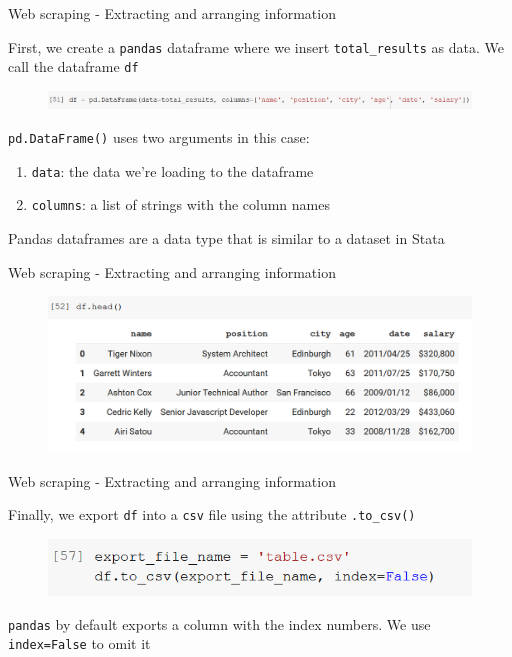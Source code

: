 \documentclass[aspectratio=169]{beamer}
\begin{document}
\begin{frame}{Web scraping - Extracting and arranging information}

	First, we create a \texttt{pandas} dataframe where we insert \texttt{total\_results} as data. We call the dataframe \texttt{df}

	\begin{figure}
		\centering
		\includegraphics[width=\linewidth]{img/df.png}
	\end{figure}

	\texttt{pd.DataFrame()} uses two arguments in this case:

	\begin{enumerate}
		\item \texttt{data}: the data we're loading to the dataframe
		\item \texttt{columns}: a list of strings with the column names
	\end{enumerate}

	Pandas dataframes are a data type that is similar to a dataset in Stata

\end{frame}

\begin{frame}{Web scraping - Extracting and arranging information}

	\begin{figure}
		\centering
		\includegraphics[width=\linewidth]{img/df_head.png}
	\end{figure}

\end{frame}

\begin{frame}{Web scraping - Extracting and arranging information}

	Finally, we export \texttt{df} into a \texttt{csv} file using the attribute \texttt{.to\_csv()}

	\begin{figure}
		\centering
		\includegraphics[width=0.6\linewidth]{img/df_to_csv.png}
	\end{figure}

	\texttt{pandas} by default exports a column with the index numbers. We use \texttt{index=False} to omit it 

\end{frame}
\end{document}
